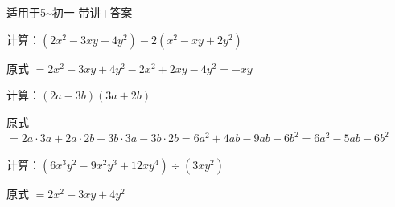 \documentclass[a4paper,12pt]{ctexart}
\begin{document}
\pagestyle{empty}

\begin{center}
  \large 适用于5\~{}初一 \quad 带讲+答案
\end{center}
\vspace{0.3cm}




\begin{example}
计算：$(2x^2-3xy+4y^2)-2(x^2-xy+2y^2)$
\end{example}
\begin{solution}
原式 $=2x^2-3xy+4y^2-2x^2+2xy-4y^2=-xy$
\end{solution}

\begin{example}
计算：$(2a-3b)(3a+2b)$
\end{example}
\begin{solution}
原式 $=2a\cdot3a+2a\cdot2b-3b\cdot3a-3b\cdot2b=6a^2+4ab-9ab-6b^2=6a^2-5ab-6b^2$
\end{solution}

\begin{example}
计算：$(6x^3y^2-9x^2y^3+12xy^4)\div(3xy^2)$
\end{example}
\begin{solution}
原式 $=2x^2-3xy+4y^2$
\end{solution}

\end{document}
